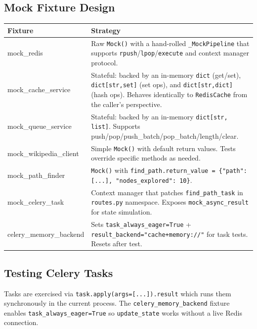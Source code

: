 \documentclass[11pt,a4paper]{article}
\begin{document}
\subsection{Mock Fixture Design}

\begin{tabularx}{\textwidth}{@{}>{\ttfamily}l X@{}}
\toprule
\normalfont\textbf{Fixture} & \textbf{Strategy} \\
\midrule
mock\_redis & Raw \texttt{Mock()} with a hand-rolled \texttt{\_MockPipeline} that supports \texttt{rpush}/\texttt{lpop}/\texttt{execute} and context manager protocol. \\
mock\_cache\_service & Stateful: backed by an in-memory \texttt{dict} (get/set), \texttt{dict[str,set]} (set ops), and \texttt{dict[str,dict]} (hash ops). Behaves identically to \texttt{RedisCache} from the caller's perspective. \\
mock\_queue\_service & Stateful: backed by an in-memory \texttt{dict[str, list]}. Supports push/pop/push\_batch/pop\_batch/length/clear. \\
mock\_wikipedia\_client & Simple \texttt{Mock()} with default return values. Tests override specific methods as needed. \\
mock\_path\_finder & \texttt{Mock()} with \texttt{find\_path.return\_value = \{"path": [...], "nodes\_explored": 10\}}. \\
mock\_celery\_task & Context manager that patches \texttt{find\_path\_task} in \texttt{routes.py} namespace. Exposes \texttt{mock\_async\_result} for state simulation. \\
celery\_memory\_backend & Sets \texttt{task\_always\_eager=True} + \texttt{result\_backend="cache+memory://"} for task tests. Resets after test. \\
\bottomrule
\end{tabularx}

\subsection{Testing Celery Tasks}

Tasks are exercised via \texttt{task.apply(args=[...]).result} which runs them synchronously in the current process. The \texttt{celery\_memory\_backend} fixture enables \texttt{task\_always\_eager=True} so \texttt{update\_state} works without a live Redis connection.
\end{document}
